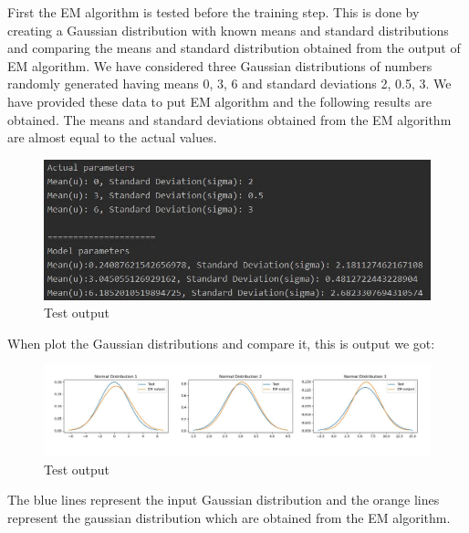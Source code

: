 \documentclass[12pt]{article}
\begin{document}
First the EM algorithm is tested before the training step. This is done by creating a Gaussian distribution with known means and standard distributions and comparing the means and standard distribution obtained from the output of EM algorithm.
\newline
We have considered three Gaussian distributions of numbers randomly generated having means 0, 3, 6 and standard deviations 2, 0.5, 3. We have provided these data to put EM  algorithm and the following results are obtained. The means and standard deviations obtained from the EM algorithm are almost equal to the actual values.
\newline
 \begin{figure}[h]
    \centering
    \includegraphics[width=13cm]{testoutput}
    \caption{Test output}
    \label{fig:Test output}
\end{figure}
When plot the Gaussian distributions and compare it, this is output we got:
 \begin{figure}[h]
    \centering
    \includegraphics[width=18cm]{gauoutput}
    \caption{Test output}
    \label{fig:Test output}
\end{figure}
The blue lines represent the input Gaussian distribution and the orange lines represent the gaussian distribution which are obtained from the EM algorithm.
\end{document}
